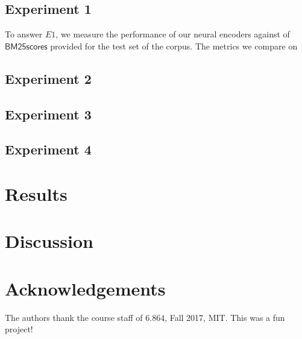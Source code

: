\documentclass{sigkddExp}
\begin{document}
\subsection{Experiment 1}
To answer $E1$, we measure the performance of our neural encoders against of $\mathsf{BM25 scores}$ provided for the test set of the corpus. The metrics we compare on 
\subsection{Experiment 2}
\subsection{Experiment 3}
\subsection{Experiment 4}

\section{Results}

\section{Discussion}
\label{discussion}

\section{Acknowledgements}
\label{ack}
The authors thank the course staff of 6.864, Fall 2017, MIT. This was a fun project!

%

%
%

\end{document}
